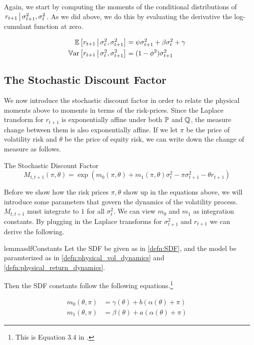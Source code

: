 \documentclass[11pt, letterpaper, twoside, final]{article}
\begin{document}
Again, we start by computing the moments of the conditional distributions of $\left. r_{t+1} \,\middle\vert\,
    \sigma^2_{t+1}, \sigma^2_t \right.$.
As we did above, we do this by evaluating the derivative the log-cumulant function at zero.

\begin{align}
    \operatorname{\mathbb{E}}\left[r_{t+1} \,\middle\vert\, \sigma^2_t, \sigma^2_{t+1}\right]  &= \psi \sigma^2_{t+1}  + \beta \sigma^2_t +
    \gamma \\
    \operatorname{\mathbb{V}ar}\left[r_{t+1} \,\middle\vert\, \sigma^2_t, \sigma^2_{t+1}\right]  &= (1 - \phi^2) \sigma^2_{t+1}  
    \label{eqn:rtn_cond_vol}
\end{align}


\subsection{The Stochastic Discount Factor}\label{sec:deriving_sdf_functions}

We now introduce the stochastic discount factor in order to relate the physical moments above to moments in terms
of the risk-prices.
Since the Laplace transform for $r_{t+1}$  is exponentially affine under both $\mathbb{P}$ and $\mathbb{Q}$, the measure change
between them is also exponentially affine.
If we let $\pi$ be the price of volatility risk and $\theta$ be the price of equity risk, we can write down the
change of measure as follows.

\begin{defn}{The Stochastic Discount Factor}
    \label{defn:SDF}
    \begin{equation}
        M_{t,t+1}(\pi, \theta) = \exp\left(m_{0}(\pi, \theta) + m_1(\pi, \theta) \sigma_t^2 - \pi \sigma^2_{t+1} -
        \theta r_{t+1}\right) 
    \end{equation}
\end{defn}


Before we show how the risk prices $\pi, \theta$ show up in the equations above, we will introduce some parameters
that govern the dynamics of the volatility process.
$M_{t,t+1}$ must integrate to $1$ for all $\sigma^2_t$.
We can view $m_{0}$ and $m_1$ as integration constants.
By plugging in the Laplace transforms for $\sigma^2_{t+1}$ and $r_{t+1}$ we can derive the following.

\begin{restatable}{lemma}{sdfConstants}
    Let the SDF be given as in \cref{defn:SDF}, and the model be paramterized as in
    \cref{defn:physical_vol_dynamics} and \cref{defn:physical_return_dynamics}.

    Then the SDF constants follow the following equations.\footnote{This is Equation $3.4$ in
    \textcite[3.4]{khrapov2016affine}.}

    \begin{align}
        \label{eqn:sdf_functions_vs_physical_functions}
        m_0(\theta, \pi)  &= \gamma(\theta) + b(\alpha(\theta) + \pi) \\
        m_1(\theta, \pi)  &= \beta(\theta) + a(\alpha(\theta) + \pi) \nonumber
    \end{align}

\end{restatable}
\end{document}
